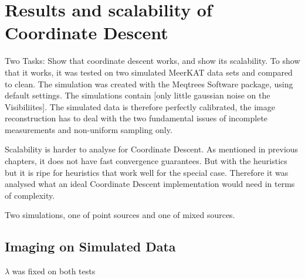 \section{Results and scalability of Coordinate Descent}
Two Tasks: Show that coordinate descent works, and show its scalability. To show that it works, it was tested on two simulated MeerKAT data sets and compared to clean. The simulation was created with the Meqtrees Software package, using default settings. The simulations contain [only little gaussian noise on the Visibiliites]. The simulated data is therefore perfectly calibrated, the image reconstruction has to deal with the two fundamental issues of incomplete measurements and non-uniform sampling only.

Scalability is harder to analyse for Coordinate Descent. As mentioned in previous chapters, it does not have fast convergence guarantees. But with the heuristics  but it is ripe for heuristics that work well for the special case. Therefore it was analysed what an ideal Coordinate Descent implementation would need in terms of complexity.

Two simulations, one of point sources and one of mixed sources. 

\subsection{Imaging on Simulated Data}

$\lambda$ was fixed on both tests

